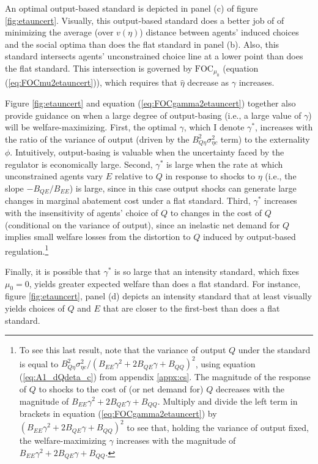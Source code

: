 \documentclass[12pt]{article}
\begin{document}
An optimal output-based standard is depicted in panel (c) of figure \ref{fig:etauncert}. Visually, this output-based standard does a better job of of minimizing the average (over $v(\eta)$) distance between agents' induced choices and the social optima than does the flat standard in panel (b). Also, this standard intersects agents' unconstrained choice line at a lower point than does the flat standard. This intersection is governed by $\text{FOC}_{\mu_0}$ (equation (\ref{eq:FOCmu2etauncert})), which requires that $\hat{\eta}$ decrease as $\gamma$ increases.

Figure \ref{fig:etauncert} and equation (\ref{eq:FOCgamma2etauncert}) together also provide guidance on when a large degree of output-basing (i.e., a large value of $\gamma$) will be welfare-maximizing. First, the optimal $\gamma$, which I denote $\gamma^*$, increases with the ratio of the variance of output (driven by the $B_{Q\eta}^2\sigma_{\eta c}^2$ term) to the externality $\phi$. Intuitively, output-basing is valuable when the uncertainty faced by the regulator is economically large. Second, $\gamma^*$ is large when the rate at which unconstrained agents vary $E$ relative to $Q$ in response to shocks to $\eta$ (i.e., the slope $-B_{QE}/B_{EE}$) is large, since in this case output shocks can generate large changes in marginal abatement cost under a flat standard. Third, $\gamma^*$ increases with the insensitivity of agents' choice of $Q$ to changes in the cost of $Q$ (conditional on the variance of output), since an inelastic net demand for $Q$ implies small welfare losses from the distortion to $Q$ induced by output-based regulation.\footnote{To see this last result, note that the variance of output $Q$ under the standard is equal to $B_{Q\eta}^2\sigma_{\eta c}^2/(B_{EE}\gamma^2+2B_{QE}\gamma+B_{QQ})^2$, using equation (\ref{eq:A1_dQdeta_c}) from appendix \ref{appx:cs}. The magnitude of the response of $Q$ to shocks to the cost of (or net demand for) $Q$ decreases with the magnitude of $B_{EE}\gamma^2+2B_{QE}\gamma+B_{QQ}$. Multiply and divide the left term in brackets in equation (\ref{eq:FOCgamma2etauncert}) by $(B_{EE}\gamma^2+2B_{QE}\gamma+B_{QQ})^2$ to see that, holding the variance of output fixed, the welfare-maximizing $\gamma$ increases with the magnitude of $B_{EE}\gamma^2+2B_{QE}\gamma+B_{QQ}$.}

Finally, it is possible that $\gamma^*$ is so large that an intensity standard, which fixes $\mu_0=0$, yields greater expected welfare than does a flat standard. For instance, figure \ref{fig:etauncert}, panel (d) depicts an intensity standard that at least visually yields choices of $Q$ and $E$ that are closer to the first-best than does a flat standard.
\end{document}
